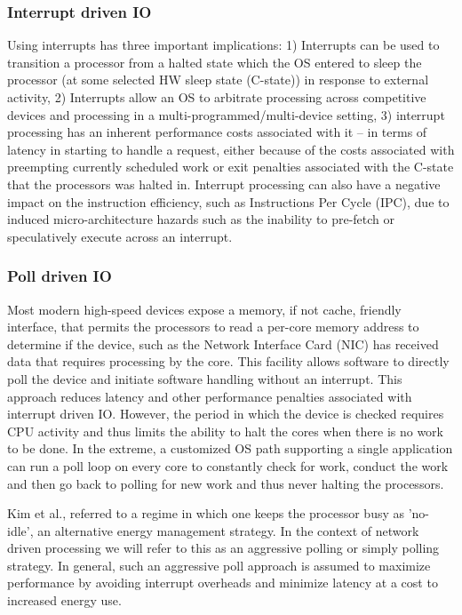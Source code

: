 \subsubsection{Interrupt driven IO}
\label{sec:workflow:interruptio}
Using interrupts has three important implications: 1) Interrupts can be used to transition a processor from a halted state which the OS entered to sleep the processor (at some selected HW sleep state (C-state)) in response to external activity, 2)  Interrupts allow an OS to arbitrate processing across competitive devices and processing in a multi-programmed/multi-device setting, 3) interrupt processing has an inherent performance costs associated with it -- in terms of latency in starting to handle a request, either because of the costs associated with preempting currently scheduled work\cite{whenpollisbetter} or exit penalties associated with the C-state that the processors was halted in\cite{cpuidle_policy}. Interrupt processing can also have a negative impact on the instruction efficiency, such as Instructions Per Cycle (IPC), due to induced micro-architecture hazards such as the inability to pre-fetch or speculatively execute across an interrupt.

\subsubsection{Poll driven IO}
\label{sec:workflow:pollio}
Most modern high-speed devices expose a memory, if not cache, friendly interface, that permits the processors to read a per-core memory address to determine if the device, such as the Network Interface Card (NIC) has received data that requires processing by the core.  This facility allows software to directly poll the device and initiate software handling without an interrupt.  This approach reduces latency and other performance penalties associated with interrupt driven IO.  However, the period in which the device is checked requires CPU activity and thus limits the ability to halt the cores when there is no work to be done.  In the extreme, a customized OS path supporting a single application can run a poll loop on every core to constantly check for work, conduct the work and then go back to polling for new work and thus never halting the processors. 

Kim et al.\cite{pacingtoidle}, referred to a regime in which one keeps the processor busy as 'no-idle', an alternative energy management strategy. In the context of network driven processing we will refer to this as an aggressive polling or simply polling strategy.  In general, such an aggressive poll approach is assumed to maximize performance by avoiding interrupt overheads and minimize latency at a cost to increased energy use. 

